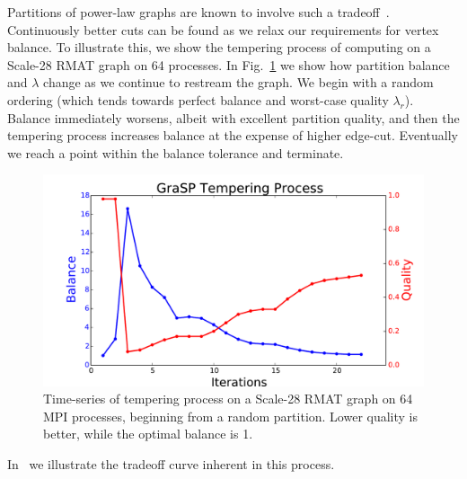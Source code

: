 Partitions of power-law graphs are known to involve such a tradeoff~\cite{Lang04findinggood}. Continuously better cuts can be found as we relax our requirements for vertex balance. To illustrate this, we show the tempering process of \ourmethod computing on a Scale-28 RMAT graph on 64 processes. In Fig.~\ref{fig:process} we show how partition balance and $\lambda$ change as we continue to restream the graph. We begin with a random ordering (which tends towards perfect balance and worst-case quality $\lambda_r$). Balance immediately worsens, albeit with excellent partition quality, and then the tempering process increases balance at the expense of higher edge-cut. Eventually we reach a point within the balance tolerance and terminate.

\begin{figure}[t!]
\centering
\includegraphics[width=0.9\columnwidth] {figures/tradeoff_process.pdf}
\caption[Caption for]{ Time-series of tempering process on a Scale-28 RMAT graph on 64 MPI processes, beginning from a random partition. Lower quality is better, while the optimal balance is 1. }
\label{fig:process}
\end{figure}

In~ we illustrate the tradeoff curve inherent in this process.

